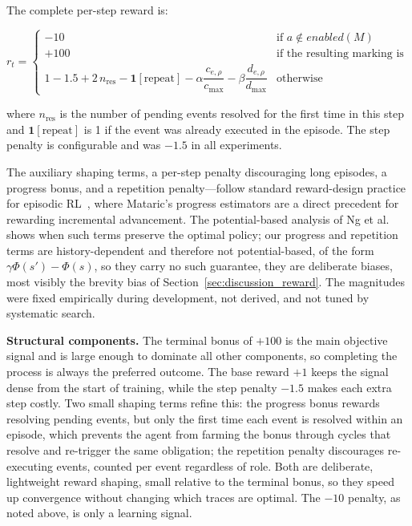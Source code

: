 The complete per-step reward is:

\begin{equation}
r_t =
\begin{cases}
-10 & \text{if } a \notin \mathit{enabled}(M) \\[4pt]
+100 & \text{if the resulting marking is accepting} \\[4pt]
1 - 1.5
+ 2\,n_{\text{res}}
- \mathbf{1}[\text{repeat}]
- \alpha\dfrac{c_{e,\rho}}{c_{\max}}
- \beta\dfrac{d_{e,\rho}}{d_{\max}}
& \text{otherwise}
\end{cases}
\label{eq:reward_total}
\end{equation}

where $n_{\text{res}}$ is the number of pending events resolved for
the first time in this step and $\mathbf{1}[\text{repeat}]$ is 1 if
the event was already executed in the episode. The step penalty is
configurable and was $-1.5$ in all experiments.

The auxiliary shaping terms, a per-step penalty discouraging long
episodes, a progress bonus, and a repetition penalty---follow standard
reward-design practice for episodic \ac{RL}~\cite{Sutton2018ReinforcementIntroduction,
Mataric1994RewardLearning}, where Mataric's progress estimators are a
direct precedent for rewarding incremental advancement. The
potential-based analysis of Ng et al.~\cite{NgPolicyShaping}
shows when such terms preserve the optimal policy; our progress and
repetition terms are history-dependent and therefore not
potential-based, of the form $\gamma\Phi(s')-\Phi(s)$, so they carry
no such guarantee, they are deliberate biases, most visibly the
brevity bias of Section~\ref{sec:discussion_reward}. The magnitudes
were fixed empirically during development, not derived, and not
tuned by systematic search.


\textbf{Structural components.}
The terminal bonus of $+100$ is the main objective signal and is
large enough to dominate all other components, so completing the
process is always the preferred outcome. The base reward $+1$ keeps
the signal dense from the start of training, while the step penalty
$-1.5$ makes each extra step costly. Two small shaping terms refine
this: the progress bonus rewards resolving pending events, but only
the first time each event is resolved within an episode, which
prevents the agent from farming the bonus through cycles that resolve
and re-trigger the same obligation; the repetition penalty
discourages re-executing events, counted per event regardless of
role. Both are deliberate, lightweight reward shaping, small relative
to the terminal bonus, so they speed up convergence without changing
which traces are optimal. The $-10$ penalty, as noted above, is only
a learning signal.

